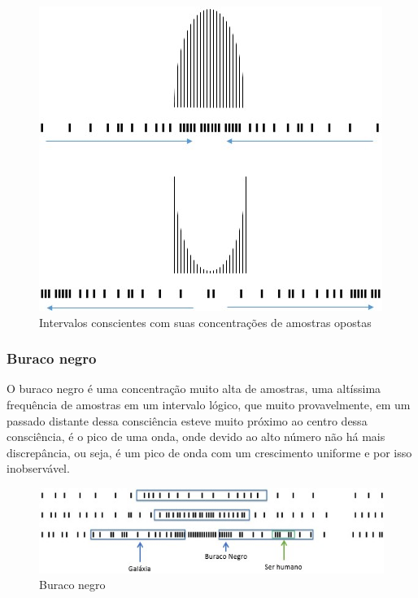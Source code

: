 \begin{figure}[H]
\caption{Intervalos conscientes com suas concentrações de amostras opostas}
\label{fig:consciousness_concentration_of_opposite_samples_within_range}
\centering
\includegraphics[scale=.8]{sections/images/consciousness_concentration_of_opposite_samples_within_range.jpg}
\end{figure}


\subsubsection{Buraco negro}
O buraco negro é uma concentração muito alta de amostras, uma altíssima frequência de amostras em um intervalo lógico, que muito provavelmente, em um passado distante dessa consciência esteve muito próximo ao centro dessa consciência, é o pico de uma onda, onde devido ao alto número não há mais discrepância, ou seja, é um pico de onda com um crescimento uniforme e por isso inobservável. 

\begin{figure}[H]
\caption{Buraco negro}
\label{fig:consciousness_black_hole}
\centering
\includegraphics[scale=1]{sections/images/consciousness_black_hole.jpg}
\end{figure}
